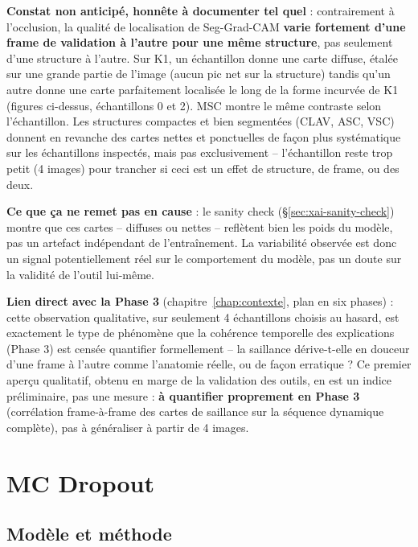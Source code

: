 \documentclass[11pt,a4paper]{report}
\begin{document}
\textbf{Constat non anticipé, honnête à documenter tel quel} : contrairement à
l'occlusion, la qualité de localisation de Seg-Grad-CAM \textbf{varie fortement
d'une frame de validation à l'autre pour une même structure}, pas seulement d'une
structure à l'autre. Sur K1, un échantillon donne une carte diffuse, étalée sur une
grande partie de l'image (aucun pic net sur la structure) tandis qu'un autre donne
une carte parfaitement localisée le long de la forme incurvée de K1 (figures
ci-dessus, échantillons 0 et 2). MSC montre le même contraste selon l'échantillon.
Les structures compactes et bien segmentées (CLAV, ASC, VSC) donnent en revanche des
cartes nettes et ponctuelles de façon plus systématique sur les échantillons
inspectés, mais pas exclusivement -- l'échantillon reste trop petit (4 images) pour
trancher si ceci est un effet de structure, de frame, ou des deux.

\textbf{Ce que ça ne remet pas en cause} : le sanity check (\S\ref{sec:xai-sanity-check})
montre que ces cartes -- diffuses ou nettes -- reflètent bien les poids du modèle,
pas un artefact indépendant de l'entraînement. La variabilité observée est donc un
signal potentiellement réel sur le comportement du modèle, pas un doute sur la
validité de l'outil lui-même.

\textbf{Lien direct avec la Phase 3} (chapitre~\ref{chap:contexte}, plan en six
phases) : cette observation qualitative, sur seulement 4 échantillons choisis au
hasard, est exactement le type de phénomène que la cohérence temporelle des
explications (Phase 3) est censée quantifier formellement -- la saillance
dérive-t-elle en douceur d'une frame à l'autre comme l'anatomie réelle, ou de façon
erratique ? Ce premier aperçu qualitatif, obtenu en marge de la validation des
outils, en est un indice préliminaire, pas une mesure : \textbf{à quantifier
proprement en Phase 3} (corrélation frame-à-frame des cartes de saillance sur la
séquence dynamique complète), pas à généraliser à partir de 4 images.

\section{MC Dropout}
\label{sec:mc-dropout}

\subsection{Modèle et méthode}
\end{document}
